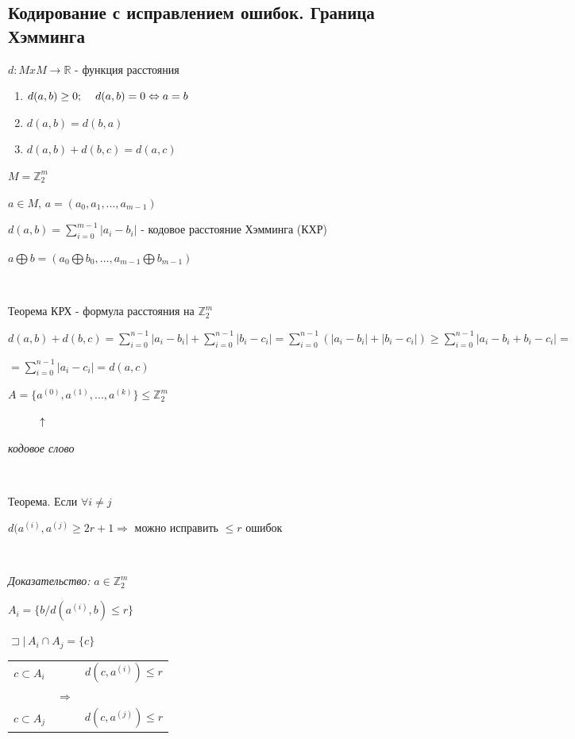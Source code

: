 \documentclass[12pt]{article}
\begin{document}
\subsection{Кодирование с исправлением ошибок. Граница Хэмминга}
$d:MxM \rightarrow \mathbb{R}$ - функция расстояния
\begin{enumerate}
    \item $d(a,b) \geq 0; \hspace{4 mm} d(a,b) = 0 \Leftrightarrow a = b$
    \item $d(a,b) = d(b,a)$
    \item $d(a,b) + d(b,c) = d(a,c)$
\end{enumerate}\par
$M = \mathbb{Z}_2^m$\par
$a \in M, \,a = (a_0, a_1, ..., a_{m-1})$\par
$d(a,b) = \sum\limits_{i=0}^{m-1} |a_i - b_i|$ - кодовое расстояние Хэмминга (КХР)\par
$a \bigoplus b = (a_0 \bigoplus b_0, ... , a_{m-1} \bigoplus b_{m-1})$\par
$ $\par
Теорема КРХ - формула расстояния на $\mathbb{Z}_2^m$\par
$d(a,b)+d(b,c) = \sum\limits_{i=0}^{n-1}|a_i - b_i|+\sum\limits_{i=0}^{n-1}|b_i - c_i|=\sum\limits_{i=0}^{n-1}(|a_i - b_i|+|b_i - c_i|) \geq \sum\limits_{i=0}^{n-1}|a_i - b_i + b_i - c_i| =$\par
$ =\sum\limits_{i=0}^{n-1}|a_i - c_i| = d(a,c)$\par
$A=\{a^{(0)}, a^{(1)}, ... , a^{(k)}\} \leq \mathbb{Z}_2^m$\par
$\hspace{1 cm} \uparrow$\par
\textit{кодовое слово}\par
$ $\par
Теорема. Если $\forall i \neq j$\par
$d(a^{(i)},a^{(j)} \geq 2r+1 \Rightarrow$ можно исправить $\leq r$ ошибок \par
$ $\par
\textit{Доказательство:} $a \in \mathbb{Z}_2^m$\par
$A_i = \{ b / d(a^{(i)}, b) \leq r \}$\par
$\sqsupset | \, A_i \cap A_j = \{ c \}$\par
\begin{tabular}{c|cc}
    $c \subset A_i$ &               & $d(c,a^{(i)}) \leq r$ \\
                    & $\Rightarrow$                         \\
    $c \subset A_j$ &               & $d(c,a^{(j)}) \leq r$ \\
\end{tabular}\par
\end{document}
